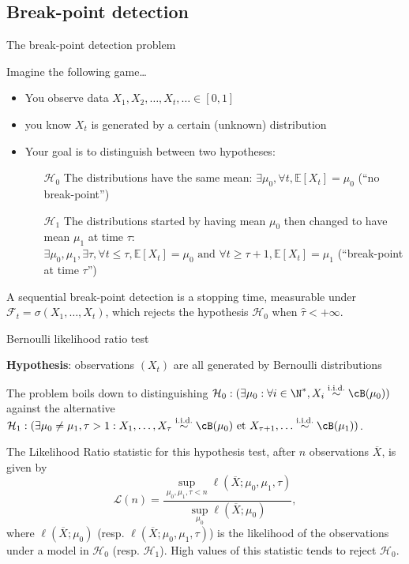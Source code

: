 \documentclass[11pt,english,ignorenonframetext,]{beamer}
\begin{document}
\subsection{\hfill{}Break-point detection\hfill{}}

\begin{frame}{The break-point detection problem}

  Imagine the following game\ldots

  \begin{itemize}
    \item You observe data $X_1,X_2,\dots,X_t,\dots \in[0,1]$
    \item you know $X_t$ is generated by a certain (unknown) distribution

    \item \alert{Your goal} is to distinguish between two hypotheses:
    \begin{itemize}
      \item[$\mathcal{H}_0$] The distributions have the same mean:
      $\exists \mu_0, \forall t, \mathbb{E}[X_t] = \mu_0$ (``no break-point'')
      \item[$\mathcal{H}_1$] The distributions started by having mean $\mu_0$ then changed to have mean $\mu_1$ at time $\tau$:
      $\exists \mu_0, \mu_1, \exists \tau, \forall t \leq \tau, \mathbb{E}[X_t] = \mu_0 \text{ and } \forall t \geq \tau + 1, \mathbb{E}[X_t] = \mu_1$ (``break-point at time $\tau$'')
    \end{itemize}
  \end{itemize}

  \pause
  A \alert{sequential break-point detection} is a stopping time,
  measurable under $\mathcal{F}_t = \sigma(X_1,\dots,X_t)$,
  which rejects the hypothesis $\mathcal{H}_0$
  when $\widehat{\tau} < +\infty$.

\end{frame}


\begin{frame}{Bernoulli likelihood ratio test}

  \textbf{Hypothesis}: observations $(X_t)$ are all generated by Bernoulli distributions

  The problem boils down to distinguishing
  $\mathcal{H}_0 : (\exists \mu_0 : \forall i\in\N^*, X_i \overset{\text{i.i.d.}}{\sim} \cB(\mu_0))$
  against the alternative
  $\mathcal{H}_1 : (\exists \mu_0 \neq \mu_1, \tau > 1 : X_1, \ldots, X_\tau \overset{\text{i.i.d.}}{\sim} \cB(\mu_0) \text{~et~} X_{\tau+1}, \ldots \overset{\text{i.i.d.}}{\sim} \cB(\mu_1))$.

  \pause

  The \alert{Likelihood Ratio statistic} for this hypothesis test, after $n$ observations $\overline{X}$, is given by
  \[ \mathcal{L}(n) = \frac{\sup_{\mu_0,\mu_1,\tau < n}\ell(\overline{X} ; \mu_0,\mu_1,\tau)}{\sup_{\mu_0}\ell(\overline{X} ;\mu_0)},\]
  where $\ell(\overline{X} ; \mu_0)$ (resp. $\ell(\overline{X} ; \mu_0,\mu_1,\tau)$) is the likelihood of the observations under a model in $\mathcal{H}_0$ (resp. $\mathcal{H}_1$).
  High values of this statistic tends to reject $\mathcal{H}_0$.

\end{frame}
\end{document}
